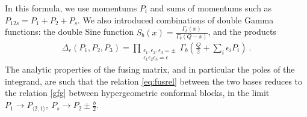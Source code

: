 \documentclass[12pt, a4paper, notitlepage, twoside]{report}
\numberwithin{equation}{section}
\theoremstyle{break}
\begin{document}
In this formula, we use momentums $P_i$ and sums of momentums such as $P_{12s}=P_1+P_2+P_s$. We also introduced combinations of double Gamma functions: the double Sine function $S_b(x) = \frac{\Gamma_b(x)}{\Gamma_b(Q-x)}$, and the products
\begin{align}
 \Delta_\epsilon(P_1,P_2,P_3) =\prod_{\substack{\epsilon_1,\epsilon_2,\epsilon_3=\pm \\ \epsilon_1\epsilon_2\epsilon_3=\epsilon}} \Gamma_b\left(\tfrac{Q}{2}+\textstyle{\sum}_i\epsilon_iP_i\right)\ .
\end{align}
The analytic properties of the fusing matrix, and in particular the poles of the integrand, are such that the relation \eqref{eq:fusrel} between the two bases reduces to the relation \eqref{gfg} between hypergeometric conformal blocks, in the limit $P_1\to P_{\langle 2,1\rangle},\ P_s\to P_2 \pm \frac{b}{2}$.
\end{document}
